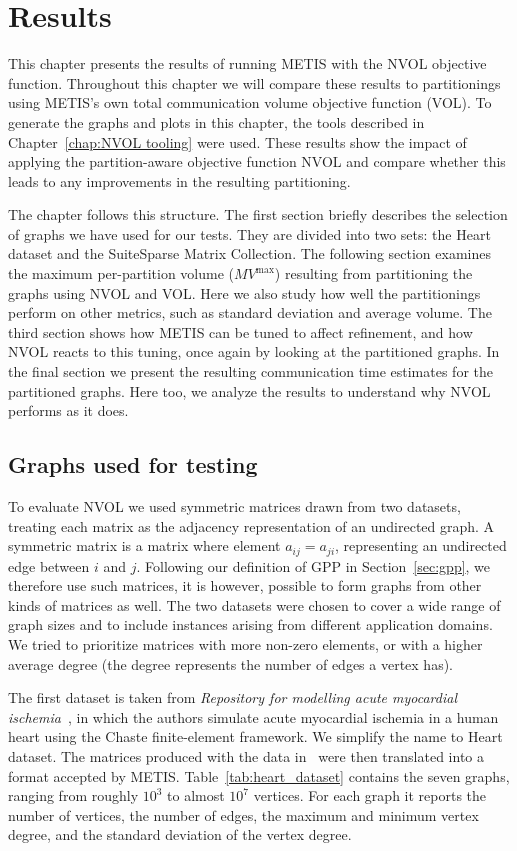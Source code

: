 \chapter{Results}\label{chap:results}
This chapter presents the results of running METIS with the NVOL objective function. Throughout this chapter we will compare these results to partitionings using METIS's own total communication volume objective function (VOL). To generate the graphs and plots in this chapter, the tools described in Chapter~\ref{chap:NVOL tooling} were used. These results show the impact of applying the partition-aware objective function NVOL and compare whether this leads to any improvements in the resulting partitioning. 

The chapter follows this structure. The first section briefly describes the selection of graphs we have used for our tests. They are divided into two sets: the Heart dataset and the SuiteSparse Matrix Collection. The following section examines the maximum per-partition volume ($MV^{\mathrm{max}}$) resulting from partitioning the graphs using NVOL and VOL. Here we also study how well the partitionings perform on other metrics, such as standard deviation and average volume. The third section shows how METIS can be tuned to affect refinement, and how NVOL reacts to this tuning, once again by looking at the partitioned graphs. In the final section we present the resulting communication time estimates for the partitioned graphs. Here too, we analyze the results to understand why NVOL performs as it does.

\section{Graphs used for testing}
To evaluate NVOL we used symmetric matrices drawn from two datasets, treating each matrix as the adjacency representation of an undirected graph. A symmetric matrix is a matrix where element $a_{ij} = a_{ji}$, representing an undirected edge between $i$ and $j$. Following our definition of GPP in Section~\ref{sec:gpp}, we therefore use such matrices, it is however, possible to form graphs from other kinds of matrices as well. The two datasets were chosen to cover a wide range of graph sizes and to include instances arising from different application domains. We tried to prioritize matrices with more non-zero elements, or with a higher average degree (the degree represents the number of edges a vertex has). 

The first dataset is taken from \textit{Repository for modelling acute myocardial ischemia}~\cite{martinez-navarro2019a}, in which the authors simulate acute myocardial ischemia in a human heart using the Chaste finite-element framework. We simplify the name to Heart dataset. The matrices produced with the data in~\cite{martinez-navarro2019a} were then translated into a format accepted by METIS. Table~\ref{tab:heart_dataset} contains the seven graphs, ranging from roughly $10^3$ to almost $10^7$ vertices. For each graph it reports the number of vertices, the number of edges, the maximum and minimum vertex degree, and the standard deviation of the vertex degree.

